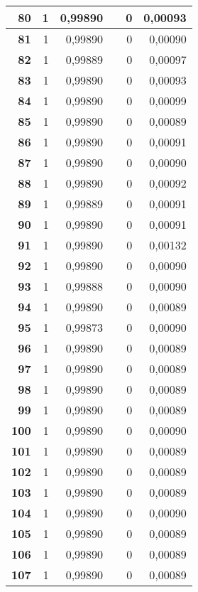 \begin{longtable}{|r|r|r|l|r|r|}
\textbf{80} & 1 & 0,99890 &  & 0 & 0,00093 \\ \hline
\textbf{81} & 1 & 0,99890 &  & 0 & 0,00090 \\ \hline
\textbf{82} & 1 & 0,99889 &  & 0 & 0,00097 \\ \hline
\textbf{83} & 1 & 0,99890 &  & 0 & 0,00093 \\ \hline
\textbf{84} & 1 & 0,99890 &  & 0 & 0,00099 \\ \hline
\textbf{85} & 1 & 0,99890 &  & 0 & 0,00089 \\ \hline
\textbf{86} & 1 & 0,99890 &  & 0 & 0,00091 \\ \hline
\textbf{87} & 1 & 0,99890 &  & 0 & 0,00090 \\ \hline
\textbf{88} & 1 & 0,99890 &  & 0 & 0,00092 \\ \hline
\textbf{89} & 1 & 0,99889 &  & 0 & 0,00091 \\ \hline
\textbf{90} & 1 & 0,99890 &  & 0 & 0,00091 \\ \hline
\textbf{91} & 1 & 0,99890 &  & 0 & 0,00132 \\ \hline
\textbf{92} & 1 & 0,99890 &  & 0 & 0,00090 \\ \hline
\textbf{93} & 1 & 0,99888 &  & 0 & 0,00090 \\ \hline
\textbf{94} & 1 & 0,99890 &  & 0 & 0,00089 \\ \hline
\textbf{95} & 1 & 0,99873 &  & 0 & 0,00090 \\ \hline
\textbf{96} & 1 & 0,99890 &  & 0 & 0,00089 \\ \hline
\textbf{97} & 1 & 0,99890 &  & 0 & 0,00089 \\ \hline
\textbf{98} & 1 & 0,99890 &  & 0 & 0,00089 \\ \hline
\textbf{99} & 1 & 0,99890 &  & 0 & 0,00089 \\ \hline
\textbf{100} & 1 & 0,99890 &  & 0 & 0,00090 \\ \hline
\textbf{101} & 1 & 0,99890 &  & 0 & 0,00089 \\ \hline
\textbf{102} & 1 & 0,99890 &  & 0 & 0,00089 \\ \hline
\textbf{103} & 1 & 0,99890 &  & 0 & 0,00089 \\ \hline
\textbf{104} & 1 & 0,99890 &  & 0 & 0,00090 \\ \hline
\textbf{105} & 1 & 0,99890 &  & 0 & 0,00089 \\ \hline
\textbf{106} & 1 & 0,99890 &  & 0 & 0,00089 \\ \hline
\textbf{107} & 1 & 0,99890 &  & 0 & 0,00089 \\ \hline

\end{longtable}
